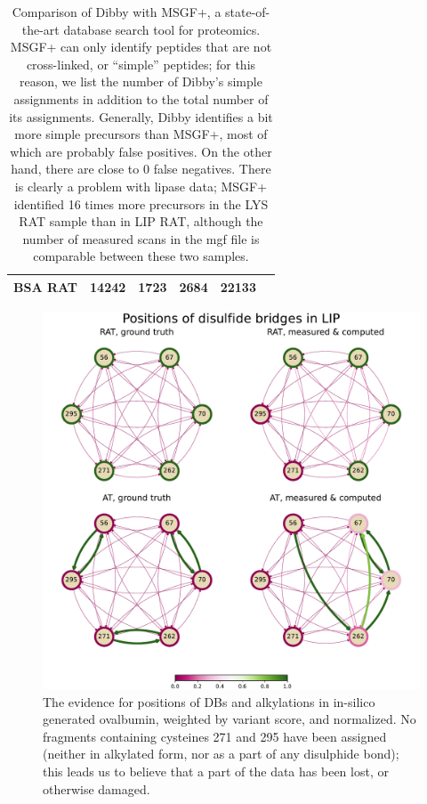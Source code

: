 \begin{table}[]
\begin{tabular}{@{}llllll@{}}
    BSA RAT                                              & 14242                           & 1723                                                                   & 2684                              & 22133 &     \\ \bottomrule
  \end{tabular}
  \centering
  \caption{Comparison of Dibby with MSGF+, a state-of-the-art database search tool for proteomics. MSGF+ can only identify peptides that are not cross-linked, or ``simple'' peptides; for this reason, we list the number of Dibby's simple assignments in addition to the total number of its assignments. Generally, Dibby identifies a bit more simple precursors than MSGF+, most of which are probably false positives. On the other hand, there are close to 0 false negatives. There is clearly a problem with lipase data; MSGF+ identified 16 times more precursors in the LYS RAT sample than in LIP RAT, although the number of measured scans in the mgf file is comparable between these two samples.}\label{tbl:measurements}
\end{table}

\begin{figure}
  \centering
  \includegraphics[width=1\linewidth]{img/lip.pdf}
  \caption{The evidence for positions of DBs and alkylations in in-silico generated ovalbumin, weighted by variant score, and normalized. No fragments containing cysteines 271 and 295 have been assigned (neither in alkylated form, nor as a part of any disulphide bond); this leads us to believe that a part of the data has been lost, or otherwise damaged.}\label{fig:lip}
\end{figure}

